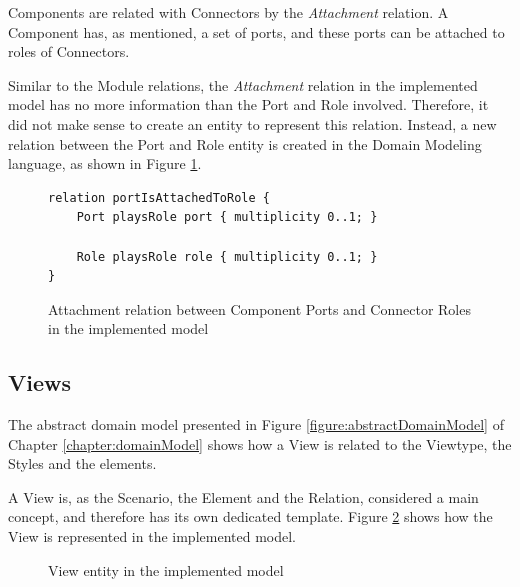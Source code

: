 Components are related with Connectors by the \textit{Attachment} relation. A Component has, as mentioned, a set of ports, and these ports can be attached to roles of Connectors.

Similar to the Module relations, the \textit{Attachment} relation in the implemented model has no more information than the Port and Role involved. Therefore, it did not make sense to create an entity to represent this relation. Instead, a new relation between the Port and Role entity is created in the Domain Modeling language, as shown in Figure \ref{figure:modelAttachmentRelation}.

\begin{figure}[h]
\lstset{style=customjava}
\begin{lstlisting}
relation portIsAttachedToRole {
	Port playsRole port { multiplicity 0..1; }
	
	Role playsRole role { multiplicity 0..1; }
}
\end{lstlisting}
\caption{Attachment relation between Component Ports and Connector Roles in the implemented model}
\label{figure:modelAttachmentRelation}
\end{figure}


\subsection{Views}
\label{subsection:modelViews}

The abstract domain model presented in Figure \ref{figure:abstractDomainModel} of Chapter \ref{chapter:domainModel} shows how a View is related to the Viewtype, the Styles and the elements. 

A View is, as the Scenario, the Element and the Relation, considered a main concept, and therefore has its own dedicated template. Figure \ref{figure:modelView} shows how the View is represented in the implemented model.

\begin{figure}[h]
\centering
\renewcommand {\umltextcolor}{black}
\renewcommand {\umlfillcolor}{none}
\renewcommand {\umldrawcolor}{black}
\caption{View entity in the implemented model}
\label{figure:modelView}
\end{figure}


